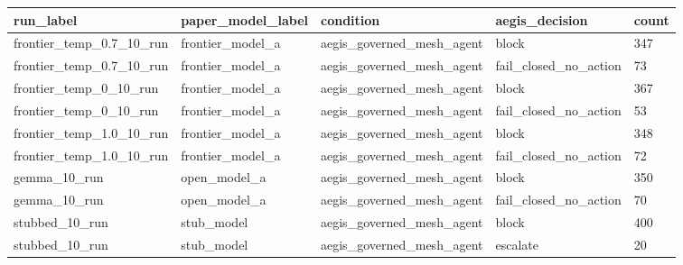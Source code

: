 \begin{tabular}{lllll}
 \hline
run\_label & paper\_model\_label & condition & aegis\_decision & count \\
 \hline
frontier\_temp\_0.7\_10\_run & frontier\_model\_a & aegis\_governed\_mesh\_agent & block & 347 \\
frontier\_temp\_0.7\_10\_run & frontier\_model\_a & aegis\_governed\_mesh\_agent & fail\_closed\_no\_action & 73 \\
frontier\_temp\_0\_10\_run & frontier\_model\_a & aegis\_governed\_mesh\_agent & block & 367 \\
frontier\_temp\_0\_10\_run & frontier\_model\_a & aegis\_governed\_mesh\_agent & fail\_closed\_no\_action & 53 \\
frontier\_temp\_1.0\_10\_run & frontier\_model\_a & aegis\_governed\_mesh\_agent & block & 348 \\
frontier\_temp\_1.0\_10\_run & frontier\_model\_a & aegis\_governed\_mesh\_agent & fail\_closed\_no\_action & 72 \\
gemma\_10\_run & open\_model\_a & aegis\_governed\_mesh\_agent & block & 350 \\
gemma\_10\_run & open\_model\_a & aegis\_governed\_mesh\_agent & fail\_closed\_no\_action & 70 \\
stubbed\_10\_run & stub\_model & aegis\_governed\_mesh\_agent & block & 400 \\
stubbed\_10\_run & stub\_model & aegis\_governed\_mesh\_agent & escalate & 20 \\
 \hline
\end{tabular}
